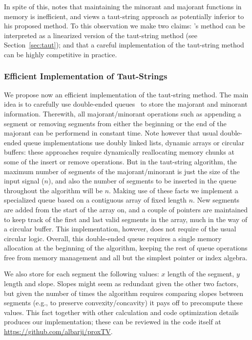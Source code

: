 \documentclass[twoside,11pt]{article}
\numberwithin{equation}{section}
\numberwithin{theorem}{section}
\begin{document}
In spite of this, \citet{fastTV} notes that maintaining the minorant and majorant functions in memory is inefficient, and views a taut-string approach as potentially inferior to his proposed method. To this observation we make two claims: \citeauthor{fastTV}'s method can be interpreted as a linearized version of the taut-string method (see Section~\ref{sec:taut}); and that a careful implementation of the taut-string method can be highly competitive in practice. %

\subsubsection{Efficient Implementation of Taut-Strings}
We propose now an efficient implementation of the taut-string method. The main idea is to carefully use double-ended queues~\citep{Knuth97} to store the majorant and minorant information. Therewith, all majorant/minorant operations such as appending a segment or removing segments from either the beginning or the end of the majorant can be performend in constant time. Note however that usual double-ended queue implementations use doubly linked lists, dynamic arrays or circular buffers: these approaches require dynamically reallocating memory chunks at some of the insert or remove operations. But in the taut-string algorithm, the maximum number of segments of the majorant/minorant is just the size of the input signal ($n$), and also the number of segments to be inserted in the queue throughout the algorithm will be $n$. Making use of these facts we implement a specialized queue based on a contiguous array of fixed length $n$. New segments are added from the start of the array on, and a couple of pointers are maintained to keep track of the first and last valid segments in the array, much in the way of a circular buffer. This implementation, however, does not require of the usual circular logic. Overall, this double-ended queue requires a single memory allocation at the beginning of the algorithm, keeping the rest of queue operations free from memory management and all but the simplest pointer or index algebra.

We also store for each segment the following values: $x$ length of the segment, $y$ length and slope. Slopes might seem as redundant given the other two factors, but given the number of times the algorithm requires comparing slopes between segments (e.g., to preserve convexity/concavity) it pays off to precompute these values. This fact together with other calculation and code optimization details produces our implementation; these can be reviewed in the code itself at \url{https://github.com/albarji/proxTV}.
\end{document}
